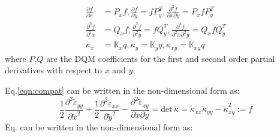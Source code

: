 \documentclass[journal]{new-aiaa}
\begin{document}
\begin{equation}
\begin{aligned}
\frac{\partial f}{\partial x} &= {P}_xf, \frac{\partial f}{\partial y} = f{P}_y^T , \frac{\partial^2 f}{\partial x \partial y} = {P}_x f{P}_y^T \\
\frac{\partial^2 f}{\partial^2 x} &= {Q}_xf, \frac{\partial^2 f}{\partial^2 y} =f {Q}_y^T, \frac{\partial^4 f}{\partial^2 x \partial^2 y} = {Q}_x f{Q}_y^T \\
\kappa_x &= \mathbb{K}_x q, \kappa_y = \mathbb{K}_y q, \kappa_{xy} = \mathbb{K}_{xy} q
\end{aligned}
\end{equation}
where $P$,$Q$ are the DQM coefficients for the first and second order partial derivatives with respect to $x$ and $y$.

Eq.\ref{eqn:compat} can be written in the non-dimensional form as:
\begin{equation}
\label{eqn:compat2}
\frac{1}{2}\frac{\partial^2 \tilde{\varepsilon}_{yy} }{\partial \tilde{x}^2} + \frac{1}{2}\frac{\partial^2 \tilde{\varepsilon}_{xx} }{\partial \tilde{y}^2} -
\frac{\partial^2\tilde{\varepsilon}_{xy} }{\partial \tilde{x}  \partial \tilde{y}}=\text{det}\,\tilde{\kappa}= \tilde{\kappa}_{xx}\tilde{\kappa}_{yy} - \tilde{\kappa}_{xy}^2:=f
\end{equation}
Eq.\label{eqn:compat2} can be written in the non-dimensional form as:
\end{document}
